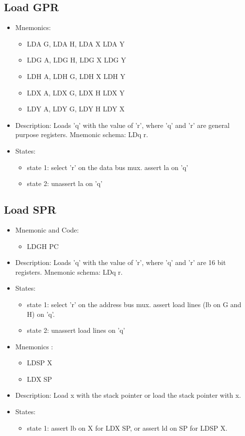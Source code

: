 \documentclass[a4paper,12pt]{article}
\begin{document}
\subsection{Load GPR}
\begin{itemize}
\item Mnemonics:
\begin{itemize}
	\item LDA G, LDA H, LDA X LDA Y
	\item LDG A, LDG H, LDG X LDG Y
	\item LDH A, LDH G, LDH X LDH Y
	\item LDX A, LDX G, LDX H LDX Y
	\item LDY A, LDY G, LDY H LDY X
\end{itemize}
\item Description: Loads 'q' with the value of 'r', where 'q' and 'r' are general purpose registers. Mnemonic schema: LDq r.
\item States:
\begin{itemize}
	\item state 1: select 'r' on the data bus mux. assert la on 'q'
	\item state 2: unassert la on 'q'
\end{itemize}
\end{itemize}

\subsection{Load SPR}
\begin{itemize}
\item Mnemonic and Code:
\begin{itemize}
	\item LDGH PC
\end{itemize}
\item Description: Loads 'q' with the value of 'r', where 'q' and 'r' are 16 bit registers. Mnemonic schema: LDq r.
\item States:
\begin{itemize}
	\item state 1: select 'r' on the address bus mux. assert load lines (lb on G and H) on 'q'.
	\item state 2: unassert load lines on 'q'
\end{itemize}
\end{itemize}

\begin{itemize}
\item Mnemonics :
\begin{itemize}
	\item LDSP X
	\item LDX SP
\end{itemize}
\item Description: Load x with the stack pointer or load the stack pointer with x.
\item States: 
\begin{itemize}
	\item state 1: assert lb on X for LDX SP, or assert ld on SP for LDSP X.
\end{itemize}
\end{itemize}
\end{document}

